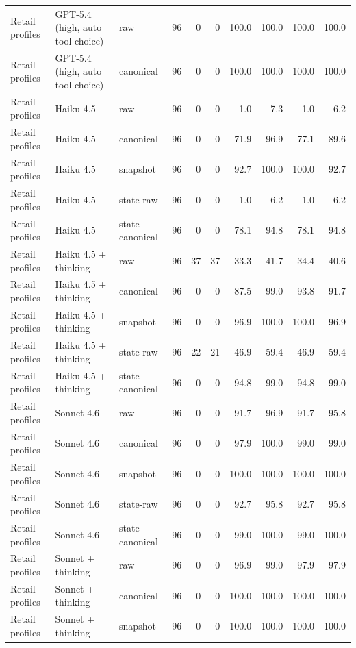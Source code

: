 {\begin{longtable}{lllrrrrrrr}
Retail profiles & GPT-5.4 (high, auto tool choice) & raw & 96 & 0 & 0 & 100.0 & 100.0 & 100.0 & 100.0 \\
Retail profiles & GPT-5.4 (high, auto tool choice) & canonical & 96 & 0 & 0 & 100.0 & 100.0 & 100.0 & 100.0 \\
Retail profiles & Haiku 4.5 & raw & 96 & 0 & 0 & 1.0 & 7.3 & 1.0 & 6.2 \\
Retail profiles & Haiku 4.5 & canonical & 96 & 0 & 0 & 71.9 & 96.9 & 77.1 & 89.6 \\
Retail profiles & Haiku 4.5 & snapshot & 96 & 0 & 0 & 92.7 & 100.0 & 100.0 & 92.7 \\
Retail profiles & Haiku 4.5 & state-raw & 96 & 0 & 0 & 1.0 & 6.2 & 1.0 & 6.2 \\
Retail profiles & Haiku 4.5 & state-canonical & 96 & 0 & 0 & 78.1 & 94.8 & 78.1 & 94.8 \\
Retail profiles & Haiku 4.5 + thinking & raw & 96 & 37 & 37 & 33.3 & 41.7 & 34.4 & 40.6 \\
Retail profiles & Haiku 4.5 + thinking & canonical & 96 & 0 & 0 & 87.5 & 99.0 & 93.8 & 91.7 \\
Retail profiles & Haiku 4.5 + thinking & snapshot & 96 & 0 & 0 & 96.9 & 100.0 & 100.0 & 96.9 \\
Retail profiles & Haiku 4.5 + thinking & state-raw & 96 & 22 & 21 & 46.9 & 59.4 & 46.9 & 59.4 \\
Retail profiles & Haiku 4.5 + thinking & state-canonical & 96 & 0 & 0 & 94.8 & 99.0 & 94.8 & 99.0 \\
Retail profiles & Sonnet 4.6 & raw & 96 & 0 & 0 & 91.7 & 96.9 & 91.7 & 95.8 \\
Retail profiles & Sonnet 4.6 & canonical & 96 & 0 & 0 & 97.9 & 100.0 & 99.0 & 99.0 \\
Retail profiles & Sonnet 4.6 & snapshot & 96 & 0 & 0 & 100.0 & 100.0 & 100.0 & 100.0 \\
Retail profiles & Sonnet 4.6 & state-raw & 96 & 0 & 0 & 92.7 & 95.8 & 92.7 & 95.8 \\
Retail profiles & Sonnet 4.6 & state-canonical & 96 & 0 & 0 & 99.0 & 100.0 & 99.0 & 100.0 \\
Retail profiles & Sonnet + thinking & raw & 96 & 0 & 0 & 96.9 & 99.0 & 97.9 & 97.9 \\
Retail profiles & Sonnet + thinking & canonical & 96 & 0 & 0 & 100.0 & 100.0 & 100.0 & 100.0 \\
Retail profiles & Sonnet + thinking & snapshot & 96 & 0 & 0 & 100.0 & 100.0 & 100.0 & 100.0 \\

\end{longtable}}
